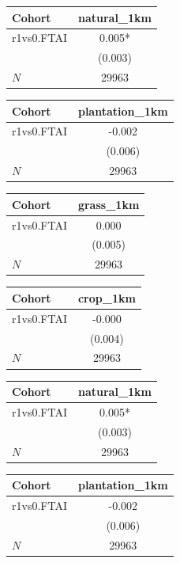 {
\def\sym#1{\ifmmode^{#1}\else\(^{#1}\)\fi}
\begin{tabular}{l*{1}{c}}
\toprule
Cohort    &natural\_1km   \\
\midrule
r1vs0.FTAI&    0.005*  \\
          &  (0.003)   \\
\midrule
\(N\)     &    29963   \\
\bottomrule
\end{tabular}
}
{
\def\sym#1{\ifmmode^{#1}\else\(^{#1}\)\fi}
\begin{tabular}{l*{1}{c}}
\toprule
Cohort    &plantation\_1km   \\
\midrule
r1vs0.FTAI&   -0.002   \\
          &  (0.006)   \\
\midrule
\(N\)     &    29963   \\
\bottomrule
\end{tabular}
}
{
\def\sym#1{\ifmmode^{#1}\else\(^{#1}\)\fi}
\begin{tabular}{l*{1}{c}}
\toprule
Cohort    &grass\_1km   \\
\midrule
r1vs0.FTAI&    0.000   \\
          &  (0.005)   \\
\midrule
\(N\)     &    29963   \\
\bottomrule
\end{tabular}
}
{
\def\sym#1{\ifmmode^{#1}\else\(^{#1}\)\fi}
\begin{tabular}{l*{1}{c}}
\toprule
Cohort    & crop\_1km   \\
\midrule
r1vs0.FTAI&   -0.000   \\
          &  (0.004)   \\
\midrule
\(N\)     &    29963   \\
\bottomrule
\end{tabular}
}
{
\def\sym#1{\ifmmode^{#1}\else\(^{#1}\)\fi}
\begin{tabular}{l*{1}{c}}
\toprule
Cohort    &natural\_1km   \\
\midrule
r1vs0.FTAI&    0.005*  \\
          &  (0.003)   \\
\midrule
\(N\)     &    29963   \\
\bottomrule
\end{tabular}
}
{
\def\sym#1{\ifmmode^{#1}\else\(^{#1}\)\fi}
\begin{tabular}{l*{1}{c}}
\toprule
Cohort    &plantation\_1km   \\
\midrule
r1vs0.FTAI&   -0.002   \\
          &  (0.006)   \\
\midrule
\(N\)     &    29963   \\
\bottomrule
\end{tabular}
}
